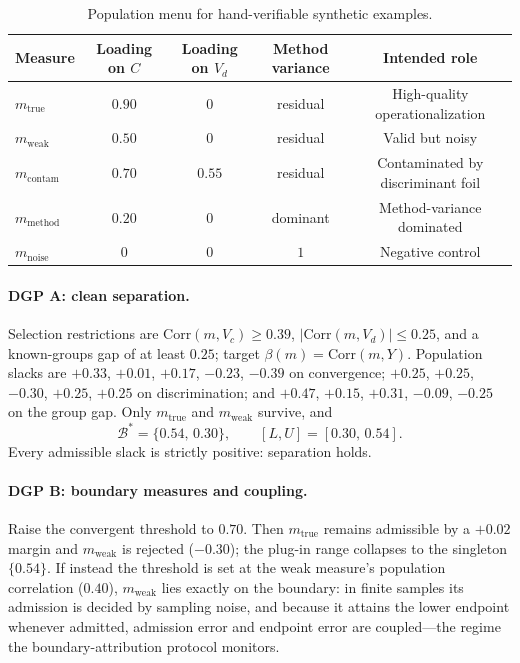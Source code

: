 \documentclass[10pt,letterpaper]{article}
\newcommand{\Bset}{\mathcal{B}}
\begin{document}
\begin{table}[ht]
\centering
\small
\caption{Population menu for hand-verifiable synthetic examples.}
\label{tab:loadings}
\begin{tabular}{@{}lcccc@{}}
\toprule
Measure & Loading on $C$ & Loading on $V_d$ & Method variance & Intended role \\
\midrule
$m_{\mathrm{true}}$   & $0.90$ & $0$    & residual & High-quality operationalization \\
$m_{\mathrm{weak}}$   & $0.50$ & $0$    & residual & Valid but noisy \\
$m_{\mathrm{contam}}$ & $0.70$ & $0.55$ & residual & Contaminated by discriminant foil \\
$m_{\mathrm{method}}$ & $0.20$ & $0$    & dominant & Method-variance dominated \\
$m_{\mathrm{noise}}$  & $0$    & $0$    & $1$     & Negative control \\
\bottomrule
\end{tabular}
\end{table}

\paragraph{DGP A: clean separation.}
Selection restrictions are $\mathrm{Corr}(m,V_c)\ge 0.39$, $|\mathrm{Corr}(m,V_d)|\le 0.25$, and a known-groups gap of at least $0.25$; target $\beta(m)=\mathrm{Corr}(m,Y)$.
Population slacks are $+0.33$, $+0.01$, $+0.17$, $-0.23$, $-0.39$ on convergence; $+0.25$, $+0.25$, $-0.30$, $+0.25$, $+0.25$ on discrimination; and $+0.47$, $+0.15$, $+0.31$, $-0.09$, $-0.25$ on the group gap.
Only $m_{\mathrm{true}}$ and $m_{\mathrm{weak}}$ survive, and
\[
\Bset^*=\bigl\{0.54,\,0.30\bigr\},\qquad [L,U]=[0.30,\,0.54].
\]
Every admissible slack is strictly positive: separation holds.

\paragraph{DGP B: boundary measures and coupling.}
Raise the convergent threshold to $0.70$.
Then $m_{\mathrm{true}}$ remains admissible by a $+0.02$ margin and $m_{\mathrm{weak}}$ is rejected ($-0.30$); the plug-in range collapses to the singleton $\{0.54\}$.
If instead the threshold is set at the weak measure's population correlation ($0.40$), $m_{\mathrm{weak}}$ lies exactly on the boundary: in finite samples its admission is decided by sampling noise, and because it attains the lower endpoint whenever admitted, admission error and endpoint error are coupled---the regime the boundary-attribution protocol monitors.
\end{document}
